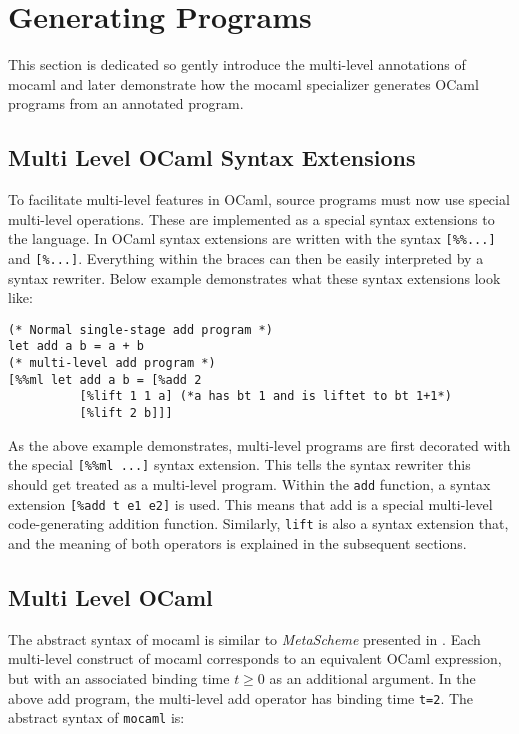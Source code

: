 
\section{Generating Programs}

This section is dedicated so gently introduce the multi-level annotations of mocaml and later demonstrate how the mocaml specializer generates OCaml programs from an annotated program.

\subsection{Multi Level OCaml Syntax Extensions}

To facilitate multi-level features in OCaml, source programs must now use special multi-level operations. These are implemented as a special syntax extensions to the language. In OCaml syntax extensions are written with the syntax \texttt{[\%\%...]} and \texttt{[\%...]}. Everything within the braces can then be easily interpreted by a syntax rewriter. Below example demonstrates what these syntax extensions look like:

\begin{verbatim}
(* Normal single-stage add program *)
let add a b = a + b
(* multi-level add program *)
[%%ml let add a b = [%add 2
          [%lift 1 1 a] (*a has bt 1 and is liftet to bt 1+1*)
          [%lift 2 b]]]
\end{verbatim}

As the above example demonstrates, multi-level programs are first decorated with the special \texttt{[\%\%ml ...]} syntax extension. This tells the syntax rewriter this should get treated as a multi-level program. Within the \texttt{add} function, a syntax extension \texttt{[\%add t e1 e2]} is used. This means that add is a special multi-level code-generating addition function. Similarly, \texttt{lift} is also a syntax extension that, and the meaning of both operators is explained in the subsequent sections.

\subsection{Multi Level OCaml}

The abstract syntax of mocaml is similar to \textit{MetaScheme} presented in \cite{multilevel}.
Each multi-level construct of mocaml corresponds to an equivalent OCaml expression, but with an associated binding time $t \ge 0$ as an additional argument. In the above add program, the multi-level add operator has binding time \texttt{t=2}. The abstract syntax of \texttt{mocaml} is:

